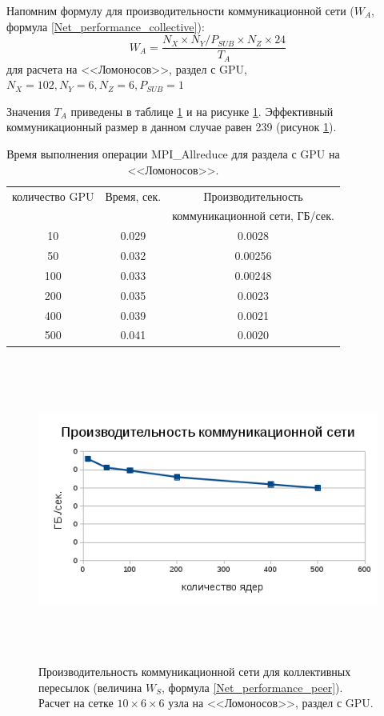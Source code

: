 Напомним формулу для производительности коммуникационной сети ($W_A$, формула \ref{Net_performance_collective}):
$$
W_A = \frac{N_X\times N_Y/P_{SUB} \times N_Z \times 24}{T_A}
$$
для расчета на <<Ломоносов>>, раздел с GPU, $N_X = 102, N_Y = 6, N_Z = 6, P_{SUB}  = 1$

Значения $T_A$ приведены в таблице \ref{Lomonosov_GPU_W_A} и на рисунке \ref{Lomonosov_GPU_W_A}. Эффективный коммуникационный размер в данном случае равен 239 (рисунок \ref{scale_W_A_Lomonosov_GPU}).

\begin{table}[ht]
\caption{Время выполнения операции MPI\_Allreduce для раздела с GPU на <<Ломоносов>>.}
\begin{tabular}{|c|c|c|}
	\hline
количество GPU & Время, сек. & Производительность  \\
               &             & коммуникационной сети, ГБ/сек. \\\hline
 10           & 0.029       & 0.0028\\
 50           & 0.032       & 0.00256\\
 100          & 0.033       & 0.00248\\
 200          & 0.035       & 0.0023\\
 400          & 0.039       & 0.0021\\
 500          & 0.041       & 0.0020\\	
\hline
\end{tabular}
\label{Lomonosov_GPU_W_A}
\end{table} 

\begin{figure}[h]
	
	
	\begin{center}
		\includegraphics[height=10cm,keepaspectratio]{images/W_A_Lomonosov_on_weak_eff.png}
		\caption{
			Производительность коммуникационной сети для коллективных пересылок (величина $W_S$, формула \ref{Net_performance_peer}). Расчет на сетке $10 \times 6 \times 6$ узла на <<Ломоносов>>, раздел с GPU. 
		}
		\label{scale_W_A_Lomonosov_GPU}
	\end{center} 
\end{figure}

